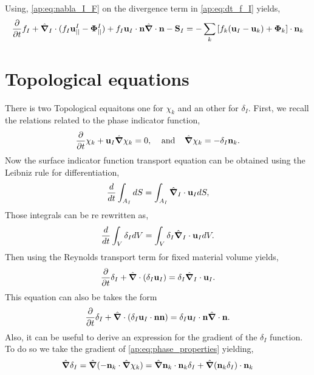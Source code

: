 Using, \ref{ap:eq:nabla_I_F} on the divergence term in \ref{ap:eq:dt_f_I} yields, 
\begin{equation}
    \frac{\partial}{\partial t} f_I  
    + \hat{\bm{\nabla}}_I \cdot (f_I \textbf{u}^I_{||} -\mathbf{\Phi}^I_{||})
    + f_I \textbf{u}_I \cdot \textbf{n} \hat{\bm{\nabla}} \cdot \textbf{n}
    - \textbf{S}_I
    = 
    - \sum_k \left[
    f_k (\textbf{u}_I - \textbf{u}_k)
    + \mathbf{\Phi}_k
    \right] \cdot \textbf{n}_k 
    \label{ap:eq:dt_f_I2}
\end{equation}



\section{Topological equations}
There is two Topological equaitons one for $\chi_k$ and an other for $\delta_I$.
First, we recall the relations related to the phase indicator function, 
\begin{equation}
    \frac{\partial}{\partial t} \chi_k
    + \textbf{u}_I  \hat{\bm{\nabla}} \chi_k 
    = 0, \;\;\;\;\text{and}\;\;\;\; 
    \hat{\bm{\nabla}} \chi_k 
    = - \delta_I \textbf{n}_k.
    \label{ap:eq:phase_properties}
\end{equation}
Now the surface indicator function transport equation can be obtained using the Leibniz rule for differentiation,  
\begin{equation*}
    \frac{d}{d t} \int_{A_I} dS
    = \int_{A_I} \hat{\bm{\nabla}}_I \cdot \textbf{u}_I dS,
\end{equation*}
Those integrals can be re rewritten as, 
\begin{equation*}
    \frac{d}{d t} \int_{V} \delta_I dV
    = \int_{V} \delta_I \hat{\bm{\nabla}}_I \cdot \textbf{u}_I dV.
\end{equation*}
Then using the Reynolds transport term for fixed material volume yields,
\begin{equation*}
    \frac{\partial}{\partial t} \delta_I
    + \hat{\bm{\nabla}} \cdot (\delta_I \textbf{u}_I)
    = \delta_I \hat{\bm{\nabla}}_I \cdot \textbf{u}_I. 
\end{equation*}
This equation can also be takes the form 
\begin{equation}
    \frac{\partial}{\partial t} \delta_I
    + \hat{\bm{\nabla}} \cdot (\delta_I \textbf{u}_I\cdot \textbf{n}\textbf{n})
    = \delta_I \textbf{u}_I \cdot \textbf{n}\hat{\bm{\nabla}} \cdot \textbf{n}. 
    \label{ap:eq:dt_delta_I}
\end{equation}
Also, it can be useful to derive an expression for the gradient of the $\delta_I$ function. 
To do so we take the gradient of \ref{ap:eq:phase_properties} yielding, 
\begin{equation*}
    \hat{\bm{\nabla}}\delta_I 
    = \hat{\bm{\nabla}}( - \textbf{n}_k \cdot \hat{\bm{\nabla}} \chi_k)
    = \hat{\bm{\nabla}}\textbf{n}_k \cdot \textbf{n}_k \delta_I
    + \hat{\bm{\nabla}}(\textbf{n}_k \delta_I) \cdot \textbf{n}_k 
\end{equation*}

